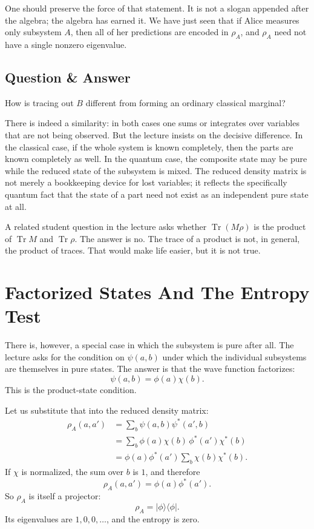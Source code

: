 One should preserve the force of that statement. It is not a slogan appended after the algebra; the algebra has earned it. We have just seen that if Alice measures only subsystem \(A\), then all of her predictions are encoded in \(\rho_A\), and \(\rho_A\) need not have a single nonzero eigenvalue.

\subsection{Question \& Answer}

How is tracing out \(B\) different from forming an ordinary classical marginal?

There is indeed a similarity: in both cases one sums or integrates over variables that are not being observed. But the lecture insists on the decisive difference. In the classical case, if the whole system is known completely, then the parts are known completely as well. In the quantum case, the composite state may be pure while the reduced state of the subsystem is mixed. The reduced density matrix is not merely a bookkeeping device for lost variables; it reflects the specifically quantum fact that the state of a part need not exist as an independent pure state at all.

A related student question in the lecture asks whether \(\operatorname{Tr}(M\rho)\) is the product of \(\operatorname{Tr} M\) and \(\operatorname{Tr}\rho\). The answer is no. The trace of a product is not, in general, the product of traces. That would make life easier, but it is not true.

\section{Factorized States And The Entropy Test}

There is, however, a special case in which the subsystem is pure after all. The lecture asks for the condition on \(\psi(a,b)\) under which the individual subsystems are themselves in pure states. The answer is that the wave function factorizes:
\begin{equation}
\psi(a,b) = \phi(a)\chi(b).
\end{equation}
This is the product-state condition.

Let us substitute that into the reduced density matrix:
\begin{align}
\rho_A(a,a')
&= \sum_b \psi(a,b)\psi^*(a',b) \\
&= \sum_b \phi(a)\chi(b)\,\phi^*(a')\chi^*(b) \\
&= \phi(a)\phi^*(a') \sum_b \chi(b)\chi^*(b).
\end{align}
If \(\chi\) is normalized, the sum over \(b\) is \(1\), and therefore
\begin{equation}
\rho_A(a,a') = \phi(a)\phi^*(a').
\end{equation}
So \(\rho_A\) is itself a projector:
\begin{equation}
\rho_A = |\phi\rangle\langle\phi|.
\end{equation}
Its eigenvalues are \(1,0,0,\dots\), and the entropy is zero.

